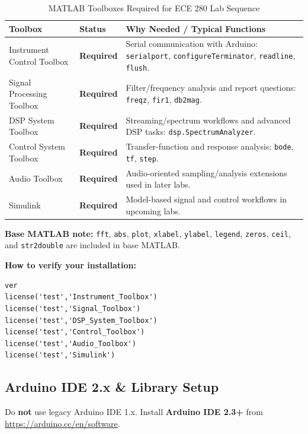 \documentclass[12pt]{article}
\begin{document}
\begin{table}[h]
\centering
\caption{MATLAB Toolboxes Required for ECE 280 Lab Sequence}
\begin{tabularx}{\linewidth}{l l X}
\toprule
\textbf{Toolbox} & \textbf{Status} & \textbf{Why Needed / Typical Functions} \\ \midrule
Instrument Control Toolbox & \textbf{Required} & Serial communication with Arduino: \texttt{serialport}, \texttt{configureTerminator}, \texttt{readline}, \texttt{flush}. \\
Signal Processing Toolbox & \textbf{Required} & Filter/frequency analysis and report questions: \texttt{freqz}, \texttt{fir1}, \texttt{db2mag}. \\
DSP System Toolbox & \textbf{Required} & Streaming/spectrum workflows and advanced DSP tasks: \texttt{dsp.SpectrumAnalyzer}. \\
Control System Toolbox & \textbf{Required} & Transfer-function and response analysis: \texttt{bode}, \texttt{tf}, \texttt{step}. \\
Audio Toolbox & \textbf{Required} & Audio-oriented sampling/analysis extensions used in later labs. \\
Simulink & \textbf{Required} & Model-based signal and control workflows in upcoming labs. \\
\bottomrule
\end{tabularx}
\end{table}

\textbf{Base MATLAB note:} \texttt{fft}, \texttt{abs}, \texttt{plot}, \texttt{xlabel}, \texttt{ylabel}, \texttt{legend}, \texttt{zeros}, \texttt{ceil}, and \texttt{str2double} are included in base MATLAB.

\textbf{How to verify your installation:}
\begin{verbatim}
ver
license('test','Instrument_Toolbox')
license('test','Signal_Toolbox')
license('test','DSP_System_Toolbox')
license('test','Control_Toolbox')
license('test','Audio_Toolbox')
license('test','Simulink')
\end{verbatim}


\subsection{Arduino IDE 2.x \& Library Setup}
Do \textbf{not} use legacy Arduino IDE 1.x. Install \textbf{Arduino IDE 2.3+} from \url{https://arduino.cc/en/software}.
\end{document}
